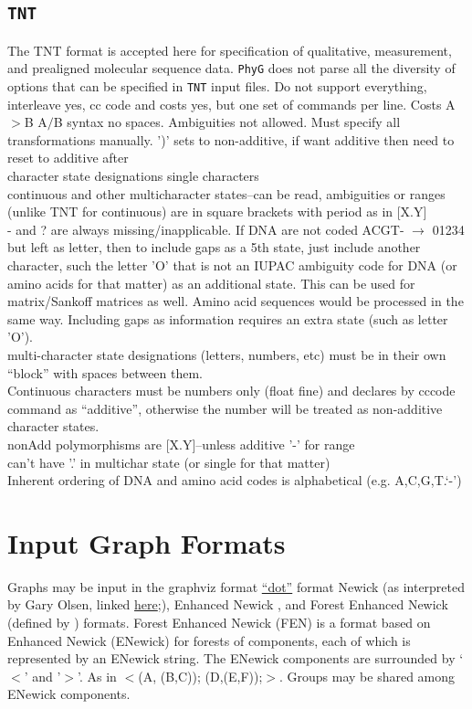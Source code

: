 \documentclass[11pt]{article}
\begin{document}
		\subsection{\texttt{TNT}}
		The TNT \citep{Goloboffetal2008} format is accepted here for specification of qualitative,
		 measurement, and prealigned molecular sequence data.  \texttt{PhyG} does not parse all the
		  diversity of options that can be specified in \texttt{TNT} input files.
		Do not support everything, interleave yes, cc code and costs yes, but one set of commands per line.
		Costs A$>$B A$/$B syntax no spaces. Ambiguities not allowed.  Must specify all transformations manually.
		')' sets to non-additive, if want additive then need to reset to additive after\\
		character state designations single characters\\
		continuous and other multicharacter states--can be read, ambiguities or ranges (unlike TNT for continuous) are 
		in square brackets with period as in [X.Y]\\
		- and ? are always missing/inapplicable.  If DNA are not coded ACGT- $\rightarrow$ 01234 but left as letter,
		then to include gaps as a 5th state, just include another character, such the letter 'O' that is not an IUPAC ambiguity code for DNA (or amino acids for that matter) as an additional state.  This can be used for matrix/Sankoff matrices as well.
		Amino acid sequences would be processed in the same way.  Including gaps as information requires
		an extra state (such as letter 'O').\\ 
		multi-character state designations (letters, numbers, etc) must be in their own ``block'' with spaces 
		between them.\\
		Continuous characters must be numbers only (float fine) and declares by cccode command as 
		``additive'', otherwise the number will be treated as non-additive character states. \\
		nonAdd polymorphisms  are [X.Y]--unless  additive '-' for range\\
		can't have '.' in multichar state (or single for that matter)\\
		Inherent ordering of DNA and amino acid codes is alphabetical (e.g. A,C,G,T.`-')
	
	\section{Input Graph Formats}
	Graphs may be input in the graphviz format \href{https://graphviz.org/}{``dot''} format Newick (as interpreted by Gary Olsen, linked \href{https://evolution.genetics.washington.edu/phylip/newick_doc.html}{here};), Enhanced Newick \cite{Cardonaetal2008},
	and Forest Enhanced Newick (defined by \citealp{WheelerPhyloSuperGraphs}) formats.
	Forest Enhanced Newick (FEN) is a format based on Enhanced Newick (ENewick) for 
	forests of components, each of which is represented by an ENewick string.  The ENewick 
	components are surrounded by `$<$' and '$>$'. As in $<$(A, (B,C)); (D,(E,F));$>$.  
	Groups may be shared among ENewick components.
	
\end{document}
